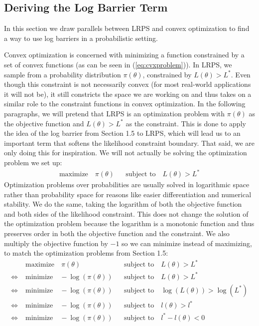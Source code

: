 \documentclass[12pt, a4paper]{report}
\begin{document}
\subsection{Deriving the Log Barrier Term}
In this section we draw parallels between LRPS and convex optimization to find a way to use log barriers in a probabilistic setting.

Convex optimization is concerned with minimizing a function constrained by a set of convex functions (as can be seen in (\ref{eq:cvxproblem})).
In LRPS, we sample from a probability distribution $\pi(\theta)$, constrained by $L(\theta) > L^*$.
Even though this constraint is not necessarily convex (for most real-world applications it will not be), it still constricts the space we are working on and thus takes on a similar role to the constraint functions in convex optimization.
In the following paragraphs, we will pretend that LRPS is an optimization problem with $\pi(\theta)$ as the objective function and $L(\theta) > L^*$ as the constraint.
This is done to apply the idea of the log barrier from Section 1.5 to LRPS, which will lead us to an important term that softens the likelihood constraint boundary.
That said, we are only doing this for inspiration.
We will not actually be solving the optimization problem we set up:
\begin{align}
    \textrm{maximize} \quad \pi(\theta) &&\textrm{subject to} \quad L(\theta) > L^* \nonumber
\end{align}
Optimization problems over probabilities are usually solved in logarithmic space rather than probability space for reasons like easier differentiation and numerical stability.
We do the same, taking the logarithm of both the objective function and both sides of the likelihood constraint.
This does not change the solution of the optimization problem because the logarithm is a monotonic function and thus preserves order in both the objective function and the constraint.
We also multiply the objective function by $-1$ so we can minimize instead of maximizing, to match the optimization problems from Section 1.5: 
\begin{align}
    &\textrm{maximize} \quad \pi(\theta) &&\textrm{subject to} \quad L(\theta) > L^* \nonumber \nonumber \\
    \iff \; &\textrm{minimize} \quad -\log(\pi(\theta)) &&\textrm{subject to} \quad L(\theta) > L^* \nonumber\\
    \iff \; &\textrm{minimize} \quad -\log(\pi(\theta)) &&\textrm{subject to} \quad \log(L(\theta)) > \log(L^*) \nonumber\\
    \iff \; &\textrm{minimize} \quad -\log(\pi(\theta)) &&\textrm{subject to} \quad l(\theta) > l^* \nonumber\\
    \iff \; &\textrm{minimize} \quad -\log(\pi(\theta)) &&\textrm{subject to} \quad l^* - l(\theta) < 0 \nonumber
\end{align}
\end{document}
